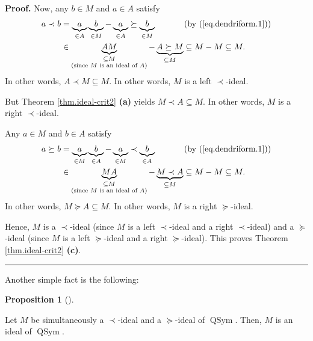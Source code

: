 \documentclass[numbers=enddot,12pt,final,onecolumn,notitlepage]{scrartcl}%
\theoremstyle{definition}
\newtheorem{prop}[theo]{Proposition}
\newenvironment{proposition}[1][]
{\begin{prop}[#1]\begin{leftbar}}
{\end{leftbar}\end{prop}}
\newenvironment{proof}[1][Proof]{\noindent\textbf{#1.} }{\ \rule{0.5em}{0.5em}}
\newenvironment{verlong}{}{}
\begin{document}
\begin{verlong}
\begin{proof}
Now, any $b\in M$ and $a\in A$ satisfy%
\begin{align*}
a\left.  \prec\right.  b  &  =\underbrace{a}_{\in A}\underbrace{b}_{\in
M}-\underbrace{a}_{\in A}\left.  \succeq\right.  \underbrace{b}_{\in
M}\ \ \ \ \ \ \ \ \ \ \left(  \text{by (\ref{eq.dendriform.1})}\right) \\
&  \in\underbrace{AM}_{\substack{\subseteq M\\\text{(since }M\text{ is an
ideal of }A\text{)}}}-\underbrace{A\left.  \succeq\right.  M}_{\subseteq
M}\subseteq M-M\subseteq M.
\end{align*}
In other words, $A\left.  \prec\right.  M\subseteq M$. In other words, $M$ is
a left $\left.  \prec\right.  $-ideal.

But Theorem \ref{thm.ideal-crit2} \textbf{(a)} yields $M\left.  \prec\right.
A\subseteq M$. In other words, $M$ is a right $\left.  \prec\right.  $-ideal.

Any $a\in M$ and $b\in A$ satisfy%
\begin{align*}
a\left.  \succeq\right.  b  &  =\underbrace{a}_{\in M}\underbrace{b}_{\in
A}-\underbrace{a}_{\in M}\left.  \prec\right.  \underbrace{b}_{\in
A}\ \ \ \ \ \ \ \ \ \ \left(  \text{by (\ref{eq.dendriform.1})}\right) \\
&  \in\underbrace{MA}_{\substack{\subseteq M\\\text{(since }M\text{ is an
ideal of }A\text{)}}}-\underbrace{M\left.  \prec\right.  A}_{\subseteq
M}\subseteq M-M\subseteq M.
\end{align*}
In other words, $M\left.  \succeq\right.  A\subseteq M$. In other words, $M$
is a right $\left.  \succeq\right.  $-ideal.

Hence, $M$ is a $\left.  \prec\right.  $-ideal (since $M$ is a left $\left.
\prec\right.  $-ideal and a right $\left.  \prec\right.  $-ideal) and a
$\left.  \succeq\right.  $-ideal (since $M$ is a left $\left.  \succeq\right.
$-ideal and a right $\left.  \succeq\right.  $-ideal). This proves Theorem
\ref{thm.ideal-crit2} \textbf{(c)}.
\end{proof}

Another simple fact is the following:

\begin{proposition}
\label{prop.ideal-crit3}Let $M$ be simultaneously a $\left.  \prec\right.
$-ideal and a $\left.  \succeq\right.  $-ideal of $\operatorname*{QSym}$.
Then, $M$ is an ideal of $\operatorname*{QSym}$.
\end{proposition}


\end{verlong}
\end{document}
